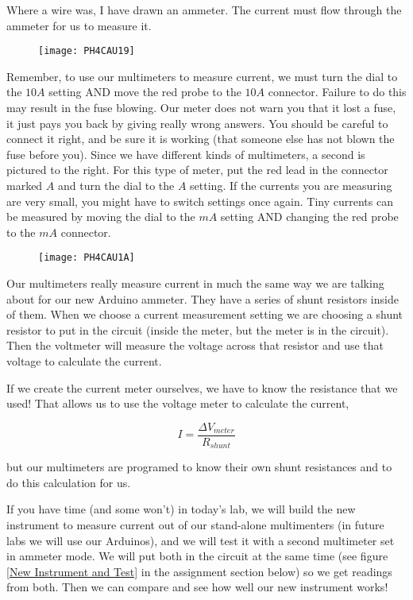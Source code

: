 Where a wire was, I have drawn an ammeter. The current must flow through the ammeter for us to measure it.

\begin{figure}[h!]
	\centering
    \texttt{[image: PH4CAU19]}
\end{figure} 

Remember, to use our multimeters to measure current, we must turn the dial to the $10\unit{A}$ setting AND move the red probe to the $10\unit{A}$ connector. Failure to do this may result in the fuse blowing. Our meter does not warn you that it lost a fuse, it just pays you back by giving really wrong answers. You should be careful to connect it right, and be sure it is working (that someone else has not blown the fuse before you). Since we have different kinds of multimeters, a second is pictured to the right. For this type of meter, put the red lead in the connector marked $A$ and turn the dial to the $A$ setting. If the currents you are measuring are very small, you might have to switch settings once again. Tiny currents can be measured by moving the dial to the $\unit{mA}$ setting AND changing the red probe to the $\unit{mA}$ connector.

\begin{figure}[h!]
	\centering
    \texttt{[image: PH4CAU1A]}
\end{figure}

Our multimeters really measure current in much the same way we are talking about for our new Arduino ammeter. They have a series of shunt resistors inside of them. When we choose a current measurement setting we are choosing a shunt resistor to put in the circuit (inside the meter, but the meter is in the circuit). Then the voltmeter will measure the voltage across that resistor and use that voltage to calculate the current.

If we create the current meter ourselves, we have to know the resistance that we used! That allows us to use the voltage meter to calculate the current,

\begin{equation*}
	I=\frac{\Delta V_{meter}}{R_{shunt}}
\end{equation*}

but our multimeters are programed to know their own shunt resistances and to do this calculation for us.

If you have time (and some won't) in today's lab, we will build the new instrument to measure current out of our stand-alone multimenters (in future labs we will use our Arduinos), and we will test it with a second multimeter set in ammeter mode. We will put both in the circuit at the same time (see figure \ref{New Instrument and Test} in the assignment section below) so we get readings from both. Then we can compare and see how well our new instrument works!

